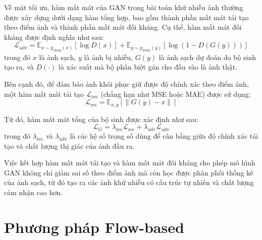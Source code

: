 Về mặt tối ưu, hàm mất mát của GAN trong bài toán khử nhiễu ảnh thường được xây dựng
dưới dạng hàm tổng hợp, bao gồm thành phần mất mát tái tạo theo điểm ảnh và thành phần
mất mát đối kháng. Cụ thể, hàm mất mát đối kháng được định nghĩa như sau:
\begin{equation}
\mathcal{L}_{\text{adv}} =
\mathbb{E}_{x \sim p_{\text{clean}}(x)} [\log D(x)] +
\mathbb{E}_{y \sim p_{\text{noisy}}(y)} [\log (1 - D(G(y)))]
\end{equation}
trong đó $x$ là ảnh sạch, $y$ là ảnh bị nhiễu, $G(y)$ là ảnh sạch dự đoán do bộ sinh tạo ra,
và $D(\cdot)$ là xác suất mà bộ phân biệt gán cho đầu vào là ảnh thật.

Bên cạnh đó, để đảm bảo ảnh khôi phục giữ được độ chính xác theo điểm ảnh,
một hàm mất mát tái tạo $\mathcal{L}_{\text{rec}}$ (chẳng hạn như MSE hoặc MAE)
được sử dụng:
\begin{equation}
\mathcal{L}_{\text{rec}} =
\mathbb{E}_{x,y} [ \| G(y) - x \| ]
\end{equation}

Từ đó, hàm mất mát tổng của bộ sinh được xác định như sau:
\begin{equation}
\mathcal{L}_{G} =
\lambda_{\text{rec}} \mathcal{L}_{\text{rec}} +
\lambda_{\text{adv}} \mathcal{L}_{\text{adv}}
\end{equation}
trong đó $\lambda_{\text{rec}}$ và $\lambda_{\text{adv}}$ là các hệ số trọng số dùng để
cân bằng giữa độ chính xác tái tạo và chất lượng thị giác của ảnh đầu ra.

Việc kết hợp hàm mất mát tái tạo và hàm mất mát đối kháng cho phép mô hình GAN
không chỉ giảm sai số theo điểm ảnh mà còn học được phân phối thống kê của ảnh sạch,
từ đó tạo ra các ảnh khử nhiễu có cấu trúc tự nhiên và chất lượng cảm nhận cao hơn.






\section{Phương pháp Flow-based}
\label{sec:fb_theory}

